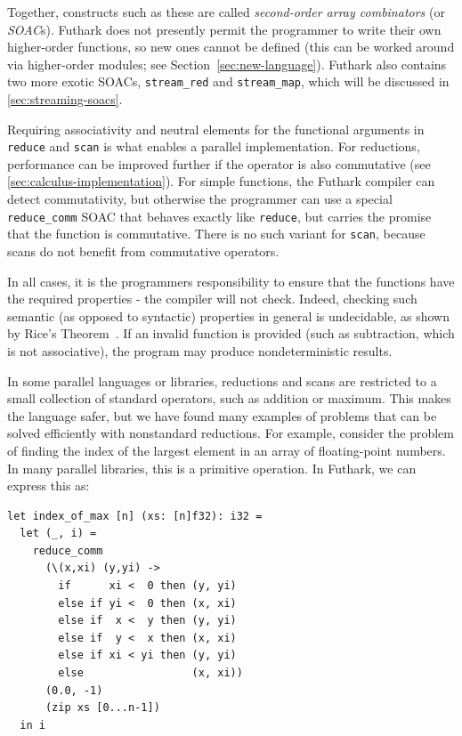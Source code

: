 Together, constructs such as these are called \textit{second-order
  array combinators} (or \textit{SOAC}s).  Futhark does not presently
permit the programmer to write their own higher-order functions, so
new ones cannot be defined (this can be worked around via higher-order
modules; see Section~\ref{sec:new-language}).  Futhark also contains
two more exotic SOACs, \lstinline{stream_red} and
\lstinline{stream_map}, which will be discussed in
\cref{sec:streaming-soacs}.

Requiring associativity and neutral elements for the functional
arguments in \lstinline{reduce} and \lstinline{scan} is what enables a
parallel implementation.  For reductions, performance can be improved
further if the operator is also commutative (see
\cref{sec:calculus-implementation}).  For simple functions, the
Futhark compiler can detect commutativity, but otherwise the
programmer can use a special \lstinline{reduce_comm} SOAC that behaves
exactly like \lstinline{reduce}, but carries the promise that the
function is commutative.  There is no such variant for
\lstinline{scan}, because scans do not benefit from commutative
operators.

In all cases, it is the programmers responsibility to ensure that the
functions have the required properties - the compiler will not check.
Indeed, checking such semantic (as opposed to syntactic) properties in
general is undecidable, as shown by Rice's
Theorem~\cite{10.2307/1990888}.  If an invalid function is provided
(such as subtraction, which is not associative), the program may produce
nondeterministic results.

In some parallel languages or libraries, reductions and scans are
restricted to a small collection of standard operators, such as
addition or maximum.  This makes the language safer, but we have found
many examples of problems that can be solved efficiently with
nonstandard reductions.  For example, consider the problem of finding
the index of the largest element in an array of floating-point
numbers.  In many parallel libraries, this is a primitive operation.
In Futhark, we can express this as:

\begin{lstlisting}
let index_of_max [n] (xs: [n]f32): i32 =
  let (_, i) =
    reduce_comm
      (\(x,xi) (y,yi) ->
        if      xi <  0 then (y, yi)
        else if yi <  0 then (x, xi)
        else if  x <  y then (y, yi)
        else if  y <  x then (x, xi)
        else if xi < yi then (y, yi)
        else                 (x, xi))
      (0.0, -1)
      (zip xs [0...n-1])
  in i
\end{lstlisting}

